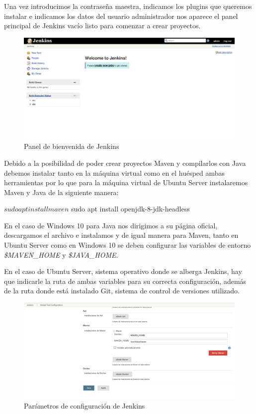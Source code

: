 \clearpage

Una vez introducimos la contraseña maestra, indicamos los plugins que queremos instalar e indicamos los datos del usuario administrador nos aparece el panel principal de Jenkins vacío listo para comenzar a crear proyectos.

\begin{figure}[!h]
\centering
   \includegraphics[width=13cm]{JenkinsVacio.png}
\caption{Panel de bienvenida de Jenkins}
\end{figure}

Debido a la posibilidad de poder crear proyectos Maven y compilarlos con Java debemos instalar tanto en la máquina virtual como en el huésped ambas herramientas por lo que para la máquina virtual de Ubuntu Server instalaremos Maven y Java de la siguiente manera:

\begin{console}
$ sudo apt install maven
$ sudo apt install openjdk-8-jdk-headless
\end{console}

En el caso de Windows 10 para Java nos dirigimos a su página oficial, descargamos el archivo e instalamos y de igual manera para Maven, tanto en Ubuntu Server como en Windows 10 se deben configurar las variables de entorno \textit{\$MAVEN\_HOME} y \textit{\$JAVA\_HOME}.

En el caso de Ubuntu Server, sistema operativo donde se alberga Jenkins, hay que indicarle la ruta de ambas variables para su correcta configuración, además de la ruta donde está instalado Git, sistema de control de versiones utilizado.

\begin{figure}[!h]
\centering
   \includegraphics[width=12cm]{ParametroMAVENHOME.PNG}
\caption{Parámetros de configuración de Jenkins}
\end{figure}

